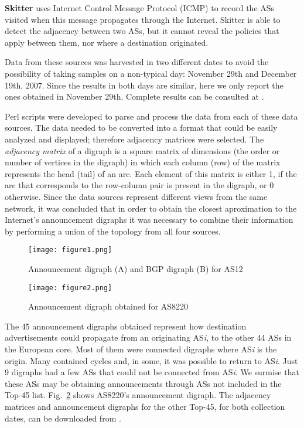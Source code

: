 \documentclass[10pt,final,journal]{IEEEtran}
\begin{document}
\textbf{Skitter} \cite{Skitterproject} uses Internet Control Message Protocol (ICMP) to record the ASs visited when this message propagates through the Internet. Skitter is able to detect the adjacency between two ASs, but it cannot reveal the policies that apply between them, nor where a destination originated.

Data from these sources was harvested in two different dates to avoid the possibility of taking samples on a non-typical day: November 29th and December 19th, 2007. Since the results in both days are similar, here we only report the ones obtained in November 29th. Complete results can be consulted at \cite{Arjona-Villicana2009}.

Perl scripts were developed to parse and process the data from each of these data sources. The data needed to be converted into a format that could be easily analyzed and displayed; therefore adjacency matrices were selected. The \emph{adjacency matrix} of a digraph is a square matrix of dimensions  (the order or number of vertices in the digraph) in which each column (row) of the matrix represents the head (tail) of an arc. Each element of this matrix is either 1, if the arc that corresponds to the row-column pair is present in the digraph, or 0 otherwise. Since the data sources represent different views from the same network, it was concluded that in order to obtain the closest aproximation to the Internet's announcement digraphs it was necessary to combine their information by performing a union of the topology from all four sources.

\begin{figure}[!t]
	\centering
		\texttt{[image: figure1.png]}
	\caption{Announcement digraph (A) and BGP digraph (B) for AS12}
	\label{fig:42_AnnDigraph}
\end{figure}

\begin{figure}[!t]
\texttt{[image: figure2.png]}
	\caption{Announcement digraph obtained for AS8220}
	\label{fig:AnncDigraph}
\end{figure}

The 45 announcement digraphs  obtained represent how destination advertisements could propagate from an originating AS\textit{i}, to the other 44 ASs in the European core. Most of them were connected digraphs where AS\textit{i} is the origin. Many contained cycles and, in some, it was possible to return to AS\textit{i}. Just 9 digraphs had a few ASs that could not be connected from AS\textit{i}. We surmise that these ASs may be obtaining announcements through ASs not included in the Top-45 list. Fig.~\ref{fig:AnncDigraph} shows AS8220's announcement digraph. The adjacency matrices and announcement digraphs for the other Top-45, for both collection dates, can be downloaded from \cite{Arjona-Villicana2009}.
\end{document}
